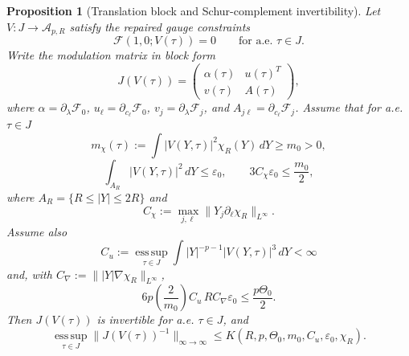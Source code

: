 \documentclass[11pt]{amsart}
\theoremstyle{plain}
\newtheorem{proposition}[theorem]{Proposition}
\theoremstyle{definition}
\theoremstyle{remark}
\begin{document}
\begin{proposition}[Translation block and Schur-complement invertibility]\label{thm:quant-jac}
Let \(V:J\to\mathcal A_{p,R}\) satisfy the repaired gauge constraints
\[
\mathcal F(1,0;V(\tau))=0\qquad\text{for a.e. }\tau\in J.
\]
Write the modulation matrix in block form
\[
J(V(\tau))=
\begin{pmatrix}
\alpha(\tau)&u(\tau)^T\\
v(\tau)&A(\tau)
\end{pmatrix},
\]
where \(\alpha=\partial_\lambda\mathcal F_0\), \(u_\ell=\partial_{c_\ell}\mathcal F_0\),
\(v_j=\partial_\lambda\mathcal F_j\), and \(A_{j\ell}=\partial_{c_\ell}\mathcal F_j\).
Assume that for a.e. \(\tau\in J\)
\[
m_\chi(\tau):=\int |V(Y,\tau)|^2\chi_R(Y)\,dY\ge m_0>0,
\]
\[
\int_{A_R}|V(Y,\tau)|^2\,dY\le\varepsilon_0,\qquad
3C_\chi\varepsilon_0\le \frac{m_0}{2},
\]
where \(A_R=\{R\le |Y|\le2R\}\) and
\[
C_\chi:=\max_{j,\ell}\|Y_j\partial_\ell\chi_R\|_{L^\infty}.
\]
Assume also
\[
C_u:=\operatorname*{ess\,sup}_{\tau\in J}\int |Y|^{-p-1}|V(Y,\tau)|^3\,dY<\infty
\]
and, with \(C_\nabla:=\||Y|\nabla\chi_R\|_{L^\infty}\),
\[
6p\left(\frac{2}{m_0}\right)C_u\,R C_\nabla\varepsilon_0
\le \frac{p\Theta_0}{2}.
\]
Then \(J(V(\tau))\) is invertible for a.e. \(\tau\in J\), and
\[
\operatorname*{ess\,sup}_{\tau\in J}\|J(V(\tau))^{-1}\|_{\infty\to\infty}
\le K(R,p,\Theta_0,m_0,C_u,\varepsilon_0,\chi_R).
\]
\end{proposition}
\end{document}
